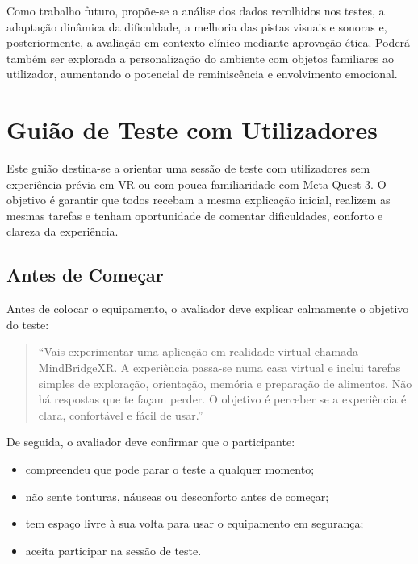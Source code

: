\documentclass[12pt,a4paper,oneside]{report}
\newcommand{\blankpage}{
    \clearpage
    \thispagestyle{empty}
    \null
    \clearpage
}
\begin{document}
Como trabalho futuro, propõe-se a análise dos dados recolhidos nos testes, a adaptação dinâmica da dificuldade, a melhoria das pistas visuais e sonoras e, posteriormente, a avaliação em contexto clínico mediante aprovação ética. Poderá também ser explorada a personalização do ambiente com objetos familiares ao utilizador, aumentando o potencial de reminiscência e envolvimento emocional.

\blankpage

\appendix

\chapter{Guião de Teste com Utilizadores}

Este guião destina-se a orientar uma sessão de teste com utilizadores sem experiência prévia em \ac{VR} ou com pouca familiaridade com Meta Quest 3. O objetivo é garantir que todos recebam a mesma explicação inicial, realizem as mesmas tarefas e tenham oportunidade de comentar dificuldades, conforto e clareza da experiência.

\section{Antes de Começar}

Antes de colocar o equipamento, o avaliador deve explicar calmamente o objetivo do teste:

\begin{quote}
    ``Vais experimentar uma aplicação em realidade virtual chamada MindBridgeXR. A experiência passa-se numa casa virtual e inclui tarefas simples de exploração, orientação, memória e preparação de alimentos. Não há respostas que te façam perder. O objetivo é perceber se a experiência é clara, confortável e fácil de usar.''
\end{quote}

De seguida, o avaliador deve confirmar que o participante:

\begin{itemize}
    \item compreendeu que pode parar o teste a qualquer momento;
    \item não sente tonturas, náuseas ou desconforto antes de começar;
    \item tem espaço livre à sua volta para usar o equipamento em segurança;
    \item aceita participar na sessão de teste.
\end{itemize}
\end{document}
